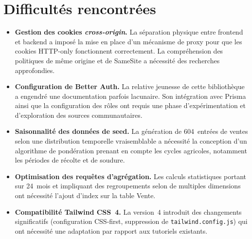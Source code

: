 \documentclass[11pt,a4paper]{report}
\begin{document}
\section{Difficultés rencontrées}
\begin{itemize}
  \item \textbf{Gestion des cookies \textit{cross-origin}.} La séparation
        physique entre frontend et backend a imposé la mise en place d'un
        mécanisme de proxy pour que les cookies HTTP-only fonctionnent
        correctement. La compréhension des politiques de même origine et de
        SameSite a nécessité des recherches approfondies.
  \item \textbf{Configuration de Better Auth.} La relative jeunesse de cette
        bibliothèque a engendré une documentation parfois lacunaire. Son
        intégration avec Prisma ainsi que la configuration des rôles ont requis
        une phase d'expérimentation et d'exploration des sources
        communautaires.
  \item \textbf{Saisonnalité des données de seed.} La génération de 604~entrées
        de ventes selon une distribution temporelle vraisemblable a nécessité la
        conception d'un algorithme de pondération prenant en compte les cycles
        agricoles, notamment les périodes de récolte et de soudure.
  \item \textbf{Optimisation des requêtes d'agrégation.} Les calculs statistiques
        portant sur 24~mois et impliquant des regroupements selon de multiples
        dimensions ont nécessité l'ajout d'index sur la table Vente.
  \item \textbf{Compatibilité Tailwind CSS~4.} La version~4 introduit des
        changements significatifs (configuration CSS-first, suppression de
        \texttt{tailwind.config.js}) qui ont nécessité une adaptation par
        rapport aux tutoriels existants.
\end{itemize}
\end{document}
